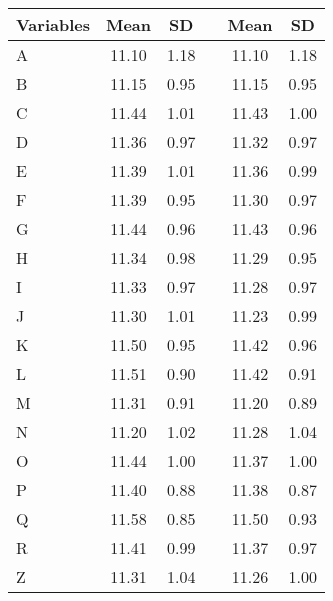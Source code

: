 \begin{tabular}{lccccc}
\toprule
Variables & Mean & SD &  \multicolumn{1}{l}{} & Mean & SD \\
\midrule
\hspace{3mm}A & 11.10 & 1.18 &   & 11.10 & 1.18 \\
\hspace{3mm}B & 11.15 & 0.95 &   & 11.15 & 0.95 \\
\hspace{3mm}C & 11.44 & 1.01 &   & 11.43 & 1.00 \\
\hspace{3mm}D & 11.36 & 0.97 &   & 11.32 & 0.97 \\
\hspace{3mm}E & 11.39 & 1.01 &   & 11.36 & 0.99 \\
\hspace{3mm}F & 11.39 & 0.95 &   & 11.30 & 0.97 \\
\hspace{3mm}G & 11.44 & 0.96 &   & 11.43 & 0.96 \\
\hspace{3mm}H & 11.34 & 0.98 &   & 11.29 & 0.95 \\
\hspace{3mm}I & 11.33 & 0.97 &   & 11.28 & 0.97 \\
\hspace{3mm}J & 11.30 & 1.01 &   & 11.23 & 0.99 \\
\hspace{3mm}K & 11.50 & 0.95 &   & 11.42 & 0.96 \\
\hspace{3mm}L & 11.51 & 0.90 &   & 11.42 & 0.91 \\
\hspace{3mm}M & 11.31 & 0.91 &   & 11.20 & 0.89 \\
\hspace{3mm}N & 11.20 & 1.02 &   & 11.28 & 1.04 \\
\hspace{3mm}O & 11.44 & 1.00 &   & 11.37 & 1.00 \\
\hspace{3mm}P & 11.40 & 0.88 &   & 11.38 & 0.87 \\
\hspace{3mm}Q & 11.58 & 0.85 &   & 11.50 & 0.93 \\
\hspace{3mm}R & 11.41 & 0.99 &   & 11.37 & 0.97 \\
\hspace{3mm}Z & 11.31 & 1.04 &   & 11.26 & 1.00 \\
\bottomrule
\end{tabular}
